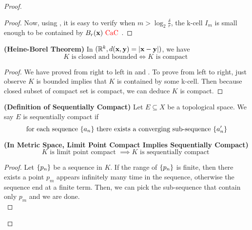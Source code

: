 \documentclass{report}
\begin{document}
\begin{proof}
\begin{proof}
Now, using , it is easy to verify when  $m>\log_2 \frac{\delta}{r}$, the k-cell $I_m$ is small enough to be contained by $B_r(\textbf{x})\text{ \textcolor{red}{CaC} }$.
\end{proof}
\begin{corollary}
\label{3.8.5}
\textbf{(Heine-Borel Theorem)} In $(\mathbb{R}^k, d(\textbf{x},\textbf{y})=|\textbf{x}-\textbf{y}|)$, we have
\begin{equation}
K\text{ is closed and bounded}\iff K\text{ is compact }
\end{equation}
\end{corollary}
\begin{proof}
  We have proved from right to left in  and  . To prove from left to right, just observe $K$ is bounded implies that $K$ is contained by some k-cell. Then because closed subset of compact set is compact, we can deduce $K$ is compact.
\end{proof}
\begin{definition}
\label{3.8.6}
\textbf{(Definition of Sequentially Compact)} Let $E\subseteq X$ be a topological space. We say $E$ is sequentially compact if 
 \begin{equation}
\text{ for each sequence $\{ a_n \}$ there exists a converging sub-sequence $\{ a'_n \}$  }
\end{equation}
\end{definition}
\begin{theorem}
\label{3.8.7}
\textbf{(In Metric Space, Limit Point Compact Implies Sequentially Compact)} 
\begin{equation}
K\text{ is limit point compact }\implies K\text{ is sequentially compact }
\end{equation}
\end{theorem}
\begin{proof}
Let $\{ p_n \}$ be a sequence in $K$. If the range of $\{ p_n \}$ is finite, then there exists a point $p_m$ appears infinitely many time in the sequence, otherwise the sequence end at a finite term. Then, we can pick the sub-sequence that contain only $p_m$ and we are done. \\


\end{proof}
\end{proof}
\end{document}
